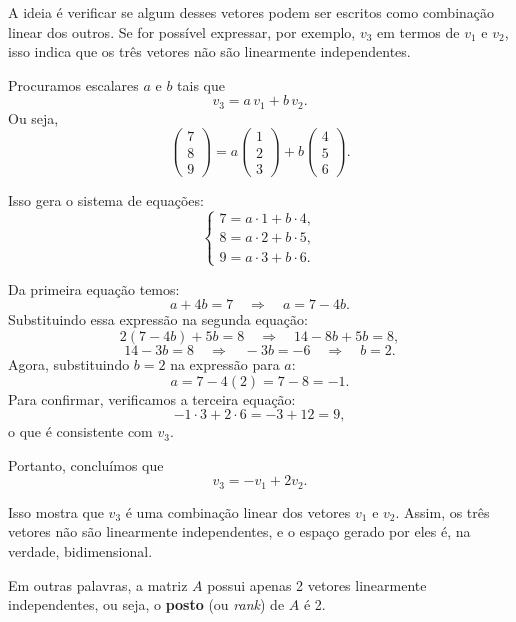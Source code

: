 \documentclass{article}
\begin{document}
\noindent A ideia é verificar se algum desses vetores podem ser escritos como combinação linear dos outros. Se for possível expressar, por exemplo, \(v_3\) em termos de \(v_1\) e \(v_2\), isso indica que os três vetores não são linearmente independentes.

\noindent Procuramos escalares \(a\) e \(b\) tais que
\[
v_3 = a\,v_1 + b\,v_2.
\]
Ou seja,
\[
\begin{pmatrix} 7 \\ 8 \\ 9 \end{pmatrix}
=
a \begin{pmatrix} 1 \\ 2 \\ 3 \end{pmatrix}
+ b \begin{pmatrix} 4 \\ 5 \\ 6 \end{pmatrix}.
\]

\noindent Isso gera o sistema de equações:
\[
\begin{cases}
7 = a \cdot 1 + b \cdot 4, \\
8 = a \cdot 2 + b \cdot 5, \\
9 = a \cdot 3 + b \cdot 6.
\end{cases}
\]

\noindent Da primeira equação temos:
\[
a + 4b = 7 \quad \Longrightarrow \quad a = 7 - 4b.
\]
Substituindo essa expressão na segunda equação:
\[
2(7 - 4b) + 5b = 8 \quad \Longrightarrow \quad 14 - 8b + 5b = 8,
\]
\[
14 - 3b = 8 \quad \Longrightarrow \quad -3b = -6 \quad \Longrightarrow \quad b = 2.
\]
Agora, substituindo \(b = 2\) na expressão para \(a\):
\[
a = 7 - 4(2) = 7 - 8 = -1.
\]
Para confirmar, verificamos a terceira equação:
\[
-1\cdot 3 + 2\cdot 6 = -3 + 12 = 9,
\]
o que é consistente com \(v_3\).

\noindent Portanto, concluímos que
\[
v_3 = -v_1 + 2v_2.
\]

\noindent Isso mostra que \(v_3\) é uma combinação linear dos vetores \(v_1\) e \(v_2\). Assim, os três vetores não são linearmente independentes, e o espaço gerado por eles é, na verdade, bidimensional.

\noindent Em outras palavras, a matriz \(A\) possui apenas 2 vetores linearmente independentes, ou seja, o \textbf{posto} (ou \emph{rank}) de \(A\) é 2.
\end{document}
